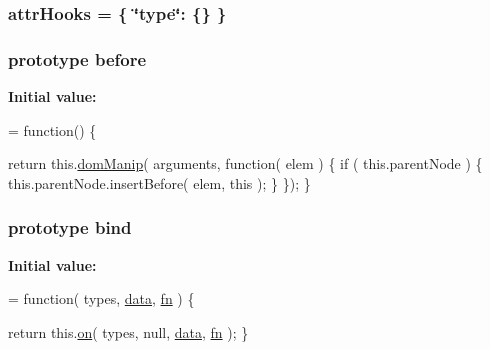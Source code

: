 \subsubsection[{attr\+Hooks}]{ attr\+Hooks = \{ \char`\"{}type\char`\"{}\+: \{\} \}}\label{jquery-1_810_82-vsdoc_8js_ad38ac586d2608526e63fb2b63fe11c6d}
\hypertarget{jquery-1_810_82-vsdoc_8js_a4d41e7b04915cba0cef42dc066c7a18f}{}
\subsubsection[{before}]{ {\bf prototype} before}\label{jquery-1_810_82-vsdoc_8js_a4d41e7b04915cba0cef42dc066c7a18f}
{\bfseries Initial value\+:}
\begin{DoxyCode}
= \textcolor{keyword}{function}() \{


        \textcolor{keywordflow}{return} this.\hyperlink{jquery-1_810_82-vsdoc_8js_a00a63bd312ef048290dc1755ccb8bae4}{domManip}( arguments, \textcolor{keyword}{function}( elem ) \{
            \textcolor{keywordflow}{if} ( this.parentNode ) \{
                this.parentNode.insertBefore( elem, \textcolor{keyword}{this} );
            \}
        \});
    \}
\end{DoxyCode}
\hypertarget{jquery-1_810_82-vsdoc_8js_affdd1c31b7dbeb03060856a4e0e33d5e}{}
\subsubsection[{bind}]{ {\bf prototype} bind}\label{jquery-1_810_82-vsdoc_8js_affdd1c31b7dbeb03060856a4e0e33d5e}
{\bfseries Initial value\+:}
\begin{DoxyCode}
= \textcolor{keyword}{function}( types, \hyperlink{jquery-1_810_82-vsdoc_8js_a609407b3456fdc3c5671a9fc4a226ff7}{data}, \hyperlink{jquery-1_810_82-vsdoc_8js_acef6bdaf6b9b20fdcca1ea86f0902c3b}{fn} ) \{


        \textcolor{keywordflow}{return} this.\hyperlink{jquery-1_810_82-vsdoc_8js_ae453b412b883f60220d73468ef6c6dbc}{on}( types, null, \hyperlink{jquery-1_810_82-vsdoc_8js_a609407b3456fdc3c5671a9fc4a226ff7}{data}, \hyperlink{jquery-1_810_82-vsdoc_8js_acef6bdaf6b9b20fdcca1ea86f0902c3b}{fn} );
    \}
\end{DoxyCode}
\hypertarget{jquery-1_810_82-vsdoc_8js_a13e7c39ee7152118878db346f297e09c}{}
